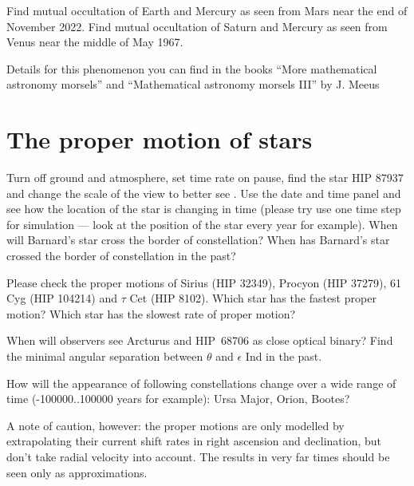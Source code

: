 Find mutual occultation of Earth and Mercury as seen from 
Mars near the end of November 2022. Find mutual occultation 
of Saturn and Mercury as seen from Venus near the middle of 
May 1967.

Details for this 
phenomenon you can find in the books ``More mathematical 
astronomy morsels'' and ``Mathematical 
astronomy morsels III'' by J. Meeus~\cite{MeeusMoreAstMorsels, MeeusAstMorselsIII}

\section{The proper motion of stars}
\label{sec:Exercises:ProperMotion}

Turn off ground and atmosphere, set time rate on pause, 
find the star HIP 87937 and change the scale of the view 
to better see . Use the date and 
time panel and see how the location of the star is 
changing in time (please try use one time step for 
simulation --- look at the position of the star every 
year for example). When will Barnard's star cross 
the border of constellation? When has Barnard's star  
crossed the border of constellation in the past? 

Please check the proper motions of Sirius (HIP 32349), 
Procyon (HIP 37279), 61 Cyg (HIP 104214) and $\tau$ Cet 
(HIP 8102). Which star has the fastest proper motion? Which 
star has the slowest rate of proper motion?

When will observers see Arcturus and HIP~68706 as close optical binary? 
Find the minimal angular separation between $\theta$ and $\epsilon$ Ind in the past.

How will the appearance of following constellations change 
over a wide range of time (-100000..100000 years for 
example): Ursa Major, Orion, Bootes?

A note of caution, however: the proper motions are only modelled by extrapolating their current 
shift rates in right ascension and declination, but don't take radial velocity into account. 
The results in very far times should be seen only as approximations.

